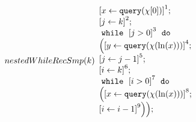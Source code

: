                 \begin{example}
                    \[
                    nestedWhileRecSmp(k)
                    \begin{array}{l}
                        \clabel{ \assign{x}{\query(\chi[0])}}^{1} ; \\
                        \clabel{\assign{j}{k} }^{2} ; \\
                            \ewhile ~ \clabel{j > 0}^{3} ~ \edo ~ \\
                            \Big(
                             \clabel{\assign{y}{\query(\chi(\ln(x)))} }^{4}  ; \\
                             \clabel{\assign{j}{j-1}}^{5} ;\\
                             \clabel{\assign{i}{k}}^{6} ;\\
                             \ewhile ~ \clabel{i > 0}^{7} ~ \edo ~ \\
                             \Big(
                              \clabel{\assign{x}{\query(\chi(\ln(x)))} }^{8}  ; \\
                              \clabel{\assign{i}{i-1}}^{9}
                              \Big) \Big);
                        \end{array}
                    \]
                    \end{example}

